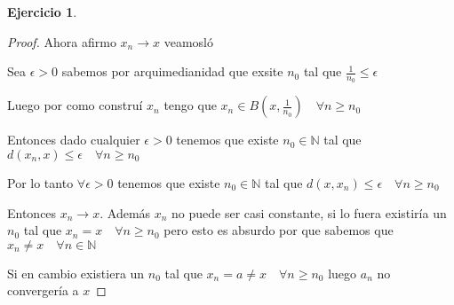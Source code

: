 \documentclass[12pt]{article}
\newcommand{\N}{\mathbb{N}}
\newcommand{\ra}{\rightarrow}
\theoremstyle{definition}
\newtheorem{ej}{Ejercicio}
\begin{document}
\begin{ej}
\begin{enumerate}
\begin{proof}
Ahora afirmo $x_{n} \ra x$ veamosló

Sea $\epsilon > 0$ sabemos por arquimedianidad que exsite $n_0$ tal que $\frac{1}{n_0} \leq \epsilon$

Luego por como construí $x_n$ tengo que $x_n \in B(x,\frac{1}{n_0}) \quad \forall n \geq n_0$

Entonces dado cualquier $\epsilon > 0$ tenemos que existe $n_0 \in \N$ tal que $d(x_n ,x ) \leq \epsilon \quad \forall n \geq n_0$

Por lo tanto $ \forall \epsilon > 0$ tenemos que existe $n_0 \in \N$ tal que $ d(x,x_n) \leq \epsilon \quad \forall n \geq n_0 $ 

Entonces $x_n \ra x$. Además $x_{n}$ no puede ser casi constante, si lo fuera existiría un $n_{0}$ tal que  $x_{n} = x \quad \forall n \geq n_{0}$ pero esto es absurdo por que sabemos que $x_n \neq x \quad \forall n \in \N$  
     
Si en cambio existiera un $n_0$ tal que $x_n = a \neq x \quad \forall n \geq n_0$ luego $a_n$ no convergería a $x$

    \end{proof}
  \end{enumerate}
\end{ej}
\end{document}
